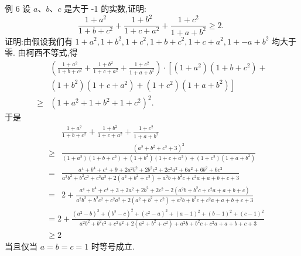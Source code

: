 例 6 设 $a 、 b 、 c$ 是大于 -1 的实数,证明:
$$
\frac{1+a^2}{1+b+c^2}+\frac{1+b^2}{1+c+a^2}+\frac{1+c^2}{1+a+b^2} \geqslant 2 \text {. }
$$
证明:由假设我们有 $1+a^2, 1+b^2, 1+c^2, 1+b+c^2, 1+c+a^2, 1+-a+ b^2$ 均大于零.
由柯西不等式,得
$$
\begin{aligned}
& \left(\frac{1+a^2}{1+b+c^2}+\frac{1+b^2}{1+c+a^2}+\frac{1+c^2}{1+a+b^2}\right) \cdot\left[\left(1+a^2\right)\left(1+b+c^2\right)+\right. \\
& \left.\left(1+b^2\right)\left(1+c+a^2\right)+\left(1+c^2\right)\left(1+a+b^2\right)\right] \\
\geqslant & \left(1+a^2+1+b^2+1+c^2\right)^2 .
\end{aligned}
$$
于是
$$
\begin{aligned}
& \frac{1+a^2}{1+b+c^2}+\frac{1+b^2}{1+c+a^2}+\frac{1+c^2}{1+a+b^2} \\
\geqslant & \frac{\left(a^2+b^2+c^2+3\right)^2}{\left(1+a^2\right)\left(1+b+c^2\right)+\left(1+b^2\right)\left(1+c+a^2\right)+\left(1+c^2\right)\left(1+a+b^2\right)} \\
= & \frac{a^4+b^4+c^4+9+2 a^2 b^2+2 b^2 c^2+2 c^2 a^2+6 a^2+6 b^2+6 c^2}{a^2 b^2+b^2 c^2+c^2 a^2+2\left(a^2+b^2+c^2\right)+a^2 b+b^2 c+c^2 a+a+b+c+3} \\
= & 2+\frac{a^4+b^4+c^4+3+2 a^2+2 b^2+2 c^2-2\left(a^2 b+b^2 c+c^2 a+a+b+c\right)}{a^2 b^2+b^2 c^2+c^2 a^2+2\left(a^2+b^2+c^2\right)+a^2 b+b^2 c+c^2 a+a+b+c+3}
\end{aligned}
$$
$$
\begin{aligned}
& =2+\frac{\left(a^2-b\right)^2+\left(b^2-c\right)^2+\left(c^2-a\right)^2+(a-1)^2+(b-1)^2+(c-1)^2}{a^2 b^2+b^2 c^2+c^2 a^2+2\left(a^2+b^2+c^2\right)+a^2 b+b^2 c+c^2 a+a+b+c+3} \\
& \geqslant 2
\end{aligned}
$$
当且仅当 $a=b=c=1$ 时等号成立.



